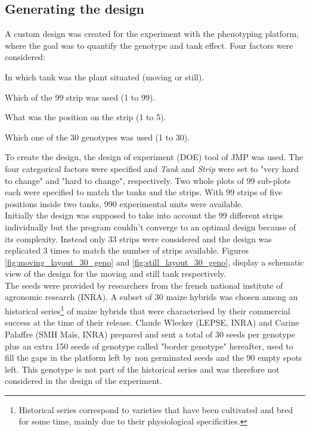 \subsection{Generating the design}
A custom design was created for the experiment with the phenotyping platform, where the goal was to quantify the genotype 
and tank effect. Four factors were considered:

\begin{description}[align=left]
\item [Tank] In which tank was the plant situated (moving or still).
\item [Strip] Which of the 99 strip was used (1 to 99).
\item [Position] What was the position on the strip (1 to 5).
\item [Genotype] Which one of the 30 genotypes was used (1 to 30).
\end{description}

To create the design, the design of experiment (DOE) tool of JMP was used. The four categorical factors were specified and 
\textit{Tank} and \textit{Strip} were set to "very hard to change" and "hard to change", respectively. Two whole plots of 99 
sub-plots each were specified to match the tanks and the strips. With 99 strips of five positions inside two tanks, 990 
experimental units were available.\\
Initially the design was supposed to take into account the 99 different strips individually but the program couldn't converge to 
an optimal design because of its complexity. Instead only 33 strips were considered and the design was replicated 3 times to 
match the number of strips available. Figures \ref{fig:moving_layout_30_geno} and \ref{fig:still_layout_30_geno}, display a schematic view 
of the design for the moving and still tank respectively.\\
The seeds were provided by researchers from the french national institute of agronomic research (INRA). A subset of 30 maize hybrids was chosen among an historical series\footnote{Historical series correspond to varieties that have been cultivated and bred for 
some time, mainly due to their physiological specificities.} of maize hybrids that were characterised by their commercial success at the time of their release. Claude Wlecker (LEPSE, INRA) and Carine Palaffre (SMH Maïs, INRA) prepared and sent a total of 30 seeds per genotype plus an extra 150 seeds of genotype called "border genotype" hereafter, used to fill the gaps in the platform left by non germinated seeds and the 90 empty spots left. This genotype is not part of the historical series and was therefore not considered in the design of the experiment.

